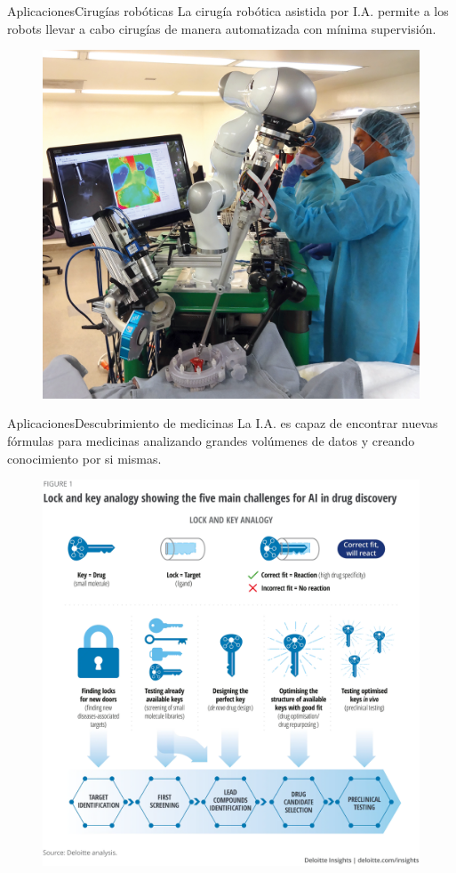\documentclass[aspectratio=169,10pt]{beamer}
\begin{document}
\begin{frame}{Aplicaciones}{Cirugías robóticas}
  La cirugía robótica asistida por I.A. permite a los robots llevar a cabo cirugías de manera automatizada con mínima supervisión.
  \begin{figure}[]
    \centering
    \includegraphics[height=0.8\textheight]{cirugia.jpg}
  \end{figure}
\end{frame}

\begin{frame}{Aplicaciones}{Descubrimiento de medicinas}
  La I.A. es capaz de encontrar nuevas fórmulas para medicinas analizando grandes volúmenes de datos y creando conocimiento por si mismas.
  \begin{figure}[]
    \centering
    \includegraphics[height=0.8\textheight]{descubrimiento.png}
  \end{figure}
\end{frame}
\end{document}
